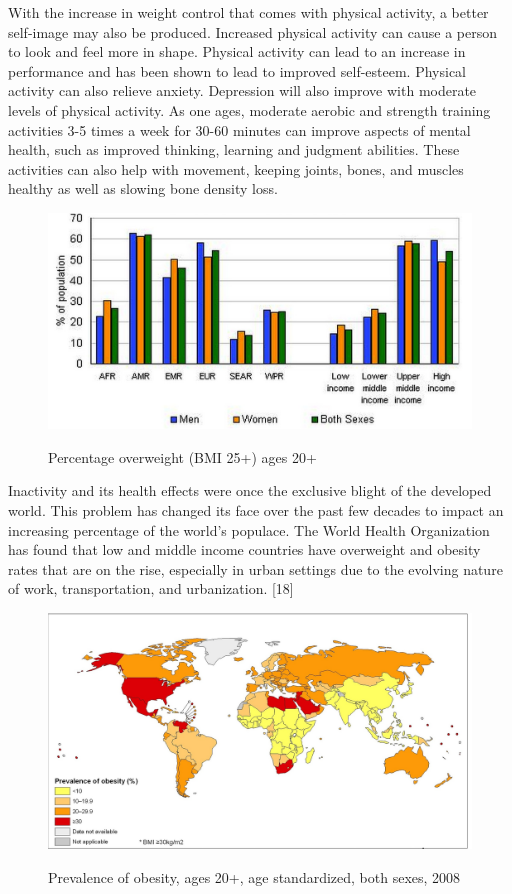 \documentclass[12pt,article]{IEEEtran}
\begin{document}
		With the increase in weight control that comes with physical activity, a better self-image may also be produced.  Increased physical activity can cause a person to look and feel more in shape.  Physical activity can lead to an increase in performance and has been shown to lead to improved self-esteem.  Physical activity can also relieve anxiety. \cite{13} Depression will also improve with moderate levels of physical activity. \cite{16}
		As one ages, moderate aerobic and strength training activities 3-5 times a week for 30-60 minutes can improve aspects of mental health, such as improved thinking, learning and judgment abilities. These activities can also help with movement, keeping joints, bones, and muscles healthy as well as slowing bone density loss. \cite{18}
		
	\begin{figure}[htpb]
    	\caption{Percentage overweight (BMI 25+) ages 20+}
    	\centering
		\vspace{10}
    	\includegraphics[width=\textwidth]{overweightbyincome}
		\cite{23}
	\end{figure}

	Inactivity and its health effects were once the exclusive blight of the developed world. This problem has 
	changed its face over the past few decades to impact an increasing percentage of the world’s populace. The 
	World Health Organization has found that low and middle income countries have overweight and obesity rates 
	that are on the rise, especially in urban settings due to the evolving nature of work, transportation, and 
	urbanization. [18] 
	
	\begin{figure}[H]
    	\caption{Prevalence of obesity, ages 20+, age standardized, both sexes, 2008}
    	\centering
		\vspace{10}
    	\includegraphics[width=.8\textwidth]{prevalenceofobesity}
		\cite{22}
	\end{figure}
	
\end{document}
